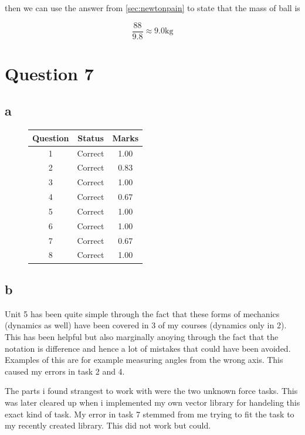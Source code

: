 \documentclass{article}
\begin{document}
then we can use the answer from \ref{sec:newtonpain} to state that the mass of ball is

$$\frac {88}{9.8} \approx 9.0\mathrm{kg}$$

\section{Question 7}

\subsection{a}

\begin{figure}[H]
	\centering
	\begin{tabular}{|c|c|c|}
		\hline
		Question & Status  & Marks \\
		\hline
		1        & Correct & 1.00  \\
		2        & Correct & 0.83  \\
		3        & Correct & 1.00  \\
		4        & Correct & 0.67  \\
		5        & Correct & 1.00  \\
		6        & Correct & 1.00  \\
		7        & Correct & 0.67  \\
		8        & Correct & 1.00  \\
		\hline
	\end{tabular}
\end{figure}

\subsection{b}

Unit 5 has been quite simple through the fact that these forms of mechanics (dynamics as well) have been covered in 3 of my courses (dynamics only in 2). This has been helpful but also marginally anoying through the fact that the notation is difference and hence a lot of mistakes that could have been avoided. Examples of this are for example measuring angles from the wrong axis. This caused my errors in task 2 and 4.

The parts i found strangest to work with were the two unknown force tasks. This was later cleared up when i implemented my own vector library for handeling this exact kind of task. My error in task 7 stemmed from me trying to fit the task to my recently created library. This did not work but could.
\end{document}

